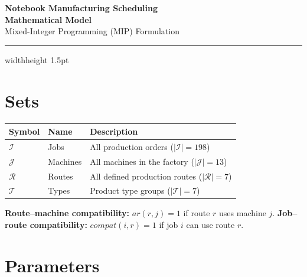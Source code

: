 \documentclass[11pt,a4paper]{article}
\begin{document}
\begin{center}
  {\LARGE\bfseries\color{headerblue}
    Notebook Manufacturing Scheduling\\[4pt]
    Mathematical Model}\\[6pt]
  {\normalsize Mixed-Integer Programming (MIP) Formulation}
\end{center}

\vspace{4pt}
\hrule width\linewidth height 1.5pt
\vspace{8pt}

\section{Sets}

\begin{tabularx}{\linewidth}{>{\bfseries}l l X}
  \toprule
  \rowcolor{lightblue}
  Symbol & Name & Description \\
  \midrule
  $\mathcal{I}$ & Jobs      & All production orders ($|\mathcal{I}|=198$) \\
  \rowcolor{rowgray}
  $\mathcal{J}$ & Machines  & All machines in the factory ($|\mathcal{J}|=13$) \\
  $\mathcal{R}$ & Routes    & All defined production routes ($|\mathcal{R}|=7$) \\
  \rowcolor{rowgray}
  $\mathcal{T}$ & Types     & Product type groups ($|\mathcal{T}|=7$) \\
  \bottomrule
\end{tabularx}

\vspace{6pt}
\textbf{Route–machine compatibility:} $\mathit{ar}(r,j)=1$ if route $r$ uses machine $j$.
\quad\textbf{Job–route compatibility:} $\mathit{compat}(i,r)=1$ if job $i$ can use route $r$.

\section{Parameters}
\end{document}
